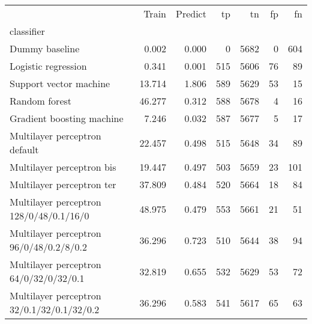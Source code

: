 \begin{tabular}{lrrrrrr}
\toprule
 & Train & Predict & tp & tn & fp & fn \\
classifier &  &  &  &  &  &  \\
\midrule
Dummy baseline & 0.002 & 0.000 & 0 & 5682 & 0 & 604 \\
Logistic regression & 0.341 & 0.001 & 515 & 5606 & 76 & 89 \\
Support vector machine & 13.714 & 1.806 & 589 & 5629 & 53 & 15 \\
Random forest & 46.277 & 0.312 & 588 & 5678 & 4 & 16 \\
Gradient boosting machine & 7.246 & 0.032 & 587 & 5677 & 5 & 17 \\
Multilayer perceptron default & 22.457 & 0.498 & 515 & 5648 & 34 & 89 \\
Multilayer perceptron bis & 19.447 & 0.497 & 503 & 5659 & 23 & 101 \\
Multilayer perceptron ter & 37.809 & 0.484 & 520 & 5664 & 18 & 84 \\
Multilayer perceptron 128/0/48/0.1/16/0 & 48.975 & 0.479 & 553 & 5661 & 21 & 51 \\
Multilayer perceptron 96/0/48/0.2/8/0.2 & 36.296 & 0.723 & 510 & 5644 & 38 & 94 \\
Multilayer perceptron 64/0/32/0/32/0.1 & 32.819 & 0.655 & 532 & 5629 & 53 & 72 \\
Multilayer perceptron 32/0.1/32/0.1/32/0.2 & 36.296 & 0.583 & 541 & 5617 & 65 & 63 \\
\bottomrule
\end{tabular}
